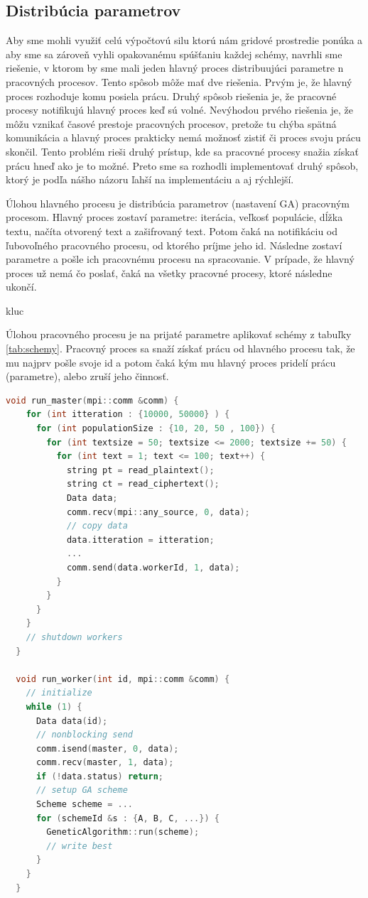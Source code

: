 \subsection{Distribúcia parametrov}
Aby sme mohli využiť celú výpočtovú silu ktorú nám gridové prostredie ponúka a aby sme sa zároveň vyhli opakovanému spúšťaniu každej schémy,
navrhli sme riešenie, v ktorom by sme mali jeden hlavný proces distribuujúci parametre n pracovných procesov.
Tento spôsob môže mať dve riešenia. Prvým je, že hlavný proces rozhoduje komu posiela prácu. Druhý spôsob riešenia je, že pracovné procesy
notifikujú hlavný proces keď sú volné. Nevýhodou prvého riešenia je, že môžu vznikať časové prestoje pracovných procesov,
pretože tu chýba spätná komunikácia a hlavný proces prakticky nemá možnosť zistiť či proces svoju prácu skončil.
Tento problém rieši druhý prístup, kde sa pracovné procesy snažia získať prácu hneď ako je to možné.
Preto sme sa rozhodli implementovať druhý spôsob, ktorý je podľa nášho názoru ľahší na implementáciu a aj rýchlejší.

Úlohou hlavného procesu je distribúcia parametrov (nastavení GA) pracovným procesom. Hlavný proces zostaví parametre: iterácia, veľkosť populácie, dĺžka textu,
načíta otvorený text a zašifrovaný text. Potom čaká na notifikáciu od ľubovoľného pracovného procesu, od ktorého príjme jeho id.
Následne zostaví parametre a pošle ich pracovnému procesu na spracovanie.
V prípade, že hlavný proces už nemá čo poslať, čaká na všetky pracovné procesy, ktoré následne ukončí.

kluc

Úlohou pracovného procesu je na prijaté parametre aplikovať schémy z tabuľky \ref{tab:schemy}.
Pracovný proces sa snaží získať prácu od hlavného procesu tak,
že mu najprv pošle svoje id a potom čaká kým mu hlavný proces pridelí prácu (parametre), alebo zruší jeho činnosť.

\begin{lstlisting}[language=c++, caption={Pseudokód ditribúcie parametrov GA}]
  void run_master(mpi::comm &comm) {
    for (int itteration : {10000, 50000} ) {
      for (int populationSize : {10, 20, 50 , 100}) {
        for (int textsize = 50; textsize <= 2000; textsize += 50) {
          for (int text = 1; text <= 100; text++) {
            string pt = read_plaintext();
            string ct = read_ciphertext();
            Data data;
            comm.recv(mpi::any_source, 0, data);
            // copy data
            data.itteration = itteration;
            ...
            comm.send(data.workerId, 1, data);
          }
        }
      } 
    }
    // shutdown workers
  }

  void run_worker(int id, mpi::comm &comm) {
    // initialize
    while (1) {
      Data data(id);
      // nonblocking send 
      comm.isend(master, 0, data);
      comm.recv(master, 1, data);
      if (!data.status) return;
      // setup GA scheme
      Scheme scheme = ...
      for (schemeId &s : {A, B, C, ...}) {
        GeneticAlgorithm::run(scheme);
        // write best
      }
    }
  }
\end{lstlisting}
